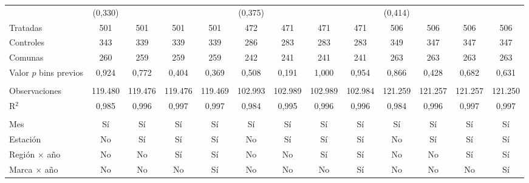 \begin{tabular}{lcccccccccccc}
                           &  (0{,}330)         &                  &                  &     &  (0{,}375)         &                  &                  &     &  (0{,}414)         &                  &                  &    \\
   Tratadas                &  501             &  501             &  501             &  501 &  472             &  471             &  471             &  471 &  506             &  506             &  506             &  506\\
   Controles               &  343             &  339             &  339             &  339 &  286             &  283             &  283             &  283 &  349             &  347             &  347             &  347\\
   Comunas                 &  260             &  259             &  259             &  259 &  242             &  241             &  241             &  241 &  263             &  263             &  263             &  263\\
   Valor $p$ bins previos  &  0{,}924           &  0{,}772           &  0{,}404           &  0{,}369 &  0{,}508           &  0{,}191           &  1{,}000           &  0{,}954 &  0{,}866           &  0{,}428           &  0{,}682           &  0{,}631\\
    \\
   Observaciones           &  119.480         &  119.476         &  119.476         &  119.469 &  102.993         &  102.989         &  102.989         &  102.984 &  121.259         &  121.257         &  121.257         &  121.250\\
   R$^2$                   &  0{,}985           &  0{,}996           &  0{,}997           &  0{,}997 &  0{,}984           &  0{,}995           &  0{,}996           &  0{,}996 &  0{,}984           &  0{,}996           &  0{,}997           &  0{,}997\\
    \\
   Mes                     &  Sí              &  Sí              &  Sí              &  Sí &  Sí              &  Sí              &  Sí              &  Sí &  Sí              &  Sí              &  Sí              &  Sí\\
   Estación                &  No              &  Sí              &  Sí              &  Sí &  No              &  Sí              &  Sí              &  Sí &  No              &  Sí              &  Sí              &  Sí\\
   Región $\times$ año     &  No              &  No              &  Sí              &  Sí &  No              &  No              &  Sí              &  Sí &  No              &  No              &  Sí              &  Sí\\
   Marca $\times$ año      &  No              &  No              &  No              &  Sí &  No              &  No              &  No              &  Sí &  No              &  No              &  No              &  Sí\\
   \bottomrule
\end{tabular}
\par\endgroup
